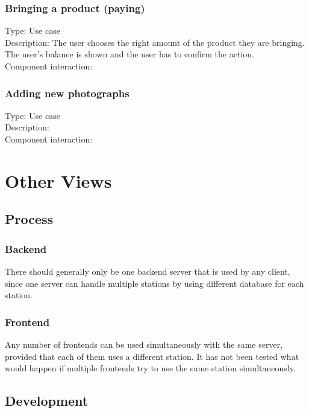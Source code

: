 \documentclass[11pt]{article}
\begin{document}
\subsubsection{Bringing a product (paying)}
Type: Use case\\
Description: The user chooses the right amount of the product they are bringing. The user's balance is shown and the user has to confirm the action.\\
Component interaction:\\

\subsubsection{Adding new photographs}
Type: Use case\\
Description:\\
Component interaction:\\

\section{Other Views}


\subsection{Process}
\subsubsection{Backend}
There should generally only be one backend server that is used by any
client, since one server can handle multiple stations by using
different database for each station.

\subsubsection{Frontend}
Any number of frontends can be used simultaneously with the same
server, provided that each of them uses a different station. It has
not been tested what would happen if multiple frontends try to use the
same station simultaneously.

\subsection{Development}
\end{document}
